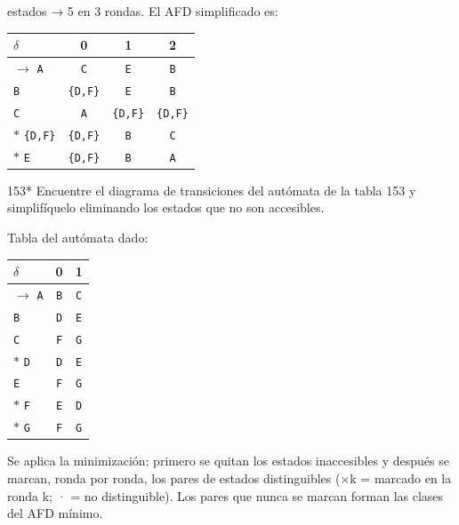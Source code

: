 \documentclass[11pt]{article}
\begin{document}
 estados → 5 en 3 rondas. El AFD simplificado es:
\begin{center}\small\begin{tabular}{lccc}\toprule
$\delta$ & 0 & 1 & 2 \\\midrule
$\to$ \texttt{A} & \texttt{C} & \texttt{E} & \texttt{B} \\
 \texttt{B} & \texttt{\{D,F\}} & \texttt{E} & \texttt{B} \\
 \texttt{C} & \texttt{A} & \texttt{\{D,F\}} & \texttt{\{D,F\}} \\
$*$ \texttt{\{D,F\}} & \texttt{\{D,F\}} & \texttt{B} & \texttt{C} \\
$*$ \texttt{E} & \texttt{\{D,F\}} & \texttt{B} & \texttt{A} \\
\bottomrule\end{tabular}\end{center}



\begin{ejercicio}{153}{*}
Encuentre el diagrama de transiciones del autómata de la tabla 153 y simplifíquelo eliminando los estados que no son accesibles.
\end{ejercicio}
\proc Tabla del autómata dado:
\begin{center}\small\begin{tabular}{lcc}\toprule
$\delta$ & 0 & 1 \\\midrule
$\to$ \texttt{A} & \texttt{B} & \texttt{C} \\
 \texttt{B} & \texttt{D} & \texttt{E} \\
 \texttt{C} & \texttt{F} & \texttt{G} \\
$*$ \texttt{D} & \texttt{D} & \texttt{E} \\
 \texttt{E} & \texttt{F} & \texttt{G} \\
$*$ \texttt{F} & \texttt{E} & \texttt{D} \\
$*$ \texttt{G} & \texttt{F} & \texttt{G} \\
\bottomrule\end{tabular}\end{center}
Se aplica la minimización: primero se quitan los estados inaccesibles y después se marcan, ronda por ronda, los pares de estados distinguibles (×k = marcado en la ronda k; · = no distinguible). Los pares que nunca se marcan forman las clases del AFD mínimo.
\end{document}
